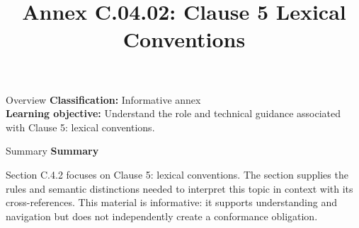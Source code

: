 \documentclass[10pt,letterpaper]{article}
\title{Annex C.04.02: Clause 5 Lexical Conventions}
\author{}
\date{}
\begin{document}
\maketitle
\begin{CornellOverviewBox}{Overview}
\textbf{Classification:} Informative annex\\[2pt]
\textbf{Learning objective:} Understand the role and technical guidance associated with Clause 5: lexical conventions.
\end{CornellOverviewBox}\begin{CornellSummaryBox}{Summary}
{\sffamily\bfseries\color{Accent} Summary}\par\vspace{3pt}Section C.4.2 focuses on Clause 5: lexical conventions. The section supplies the rules and semantic distinctions needed to interpret this topic in context with its cross-references. This material is informative: it supports understanding and navigation but does not independently create a conformance obligation.
\end{CornellSummaryBox}
\end{document}
